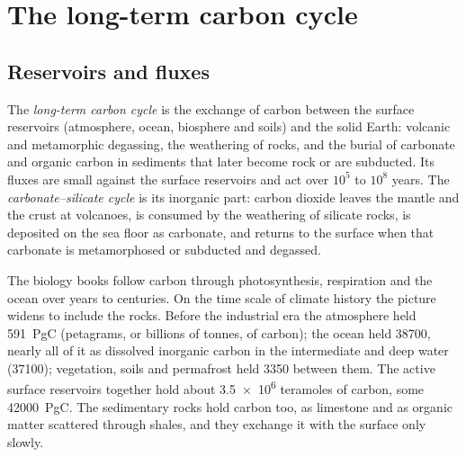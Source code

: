 \section{The long-term carbon cycle}\label{sec:b2:deep-time-climate:cycle}

\subsection*{Reservoirs and fluxes}

\begin{definition}\label{def:b2:deep-time-climate:carbon-cycle}
The \emph{long-term carbon cycle} is the exchange of carbon between
the surface reservoirs (atmosphere, ocean, biosphere and soils) and the solid Earth: volcanic and
metamorphic degassing, the weathering of rocks, and the burial of carbonate and organic carbon in
sediments that later become rock or are subducted. Its fluxes are small against the surface
reservoirs and act over $10^5$ to $10^8$ years. The \emph{carbonate--silicate
cycle} is its inorganic part: carbon dioxide leaves the mantle
and the crust at volcanoes, is consumed by the weathering of silicate rocks, is deposited on the
sea floor as carbonate, and returns to the surface when that carbonate is metamorphosed or
subducted and degassed.
\end{definition}

The biology books follow carbon through photosynthesis, respiration and the ocean over years to
centuries. On the time scale of climate history the picture widens to include the rocks. Before
the industrial era the atmosphere held \qty{591}{PgC} (petagrams, or billions of tonnes, of carbon);
the ocean held \num{38700}, nearly all of it as dissolved inorganic carbon in the intermediate and
deep water (\num{37100}); vegetation, soils and permafrost held \num{3350} between them. The
active surface reservoirs together hold about \num{3.5e6} teramoles of carbon, some
\qty{42000}{PgC}. The sedimentary rocks hold carbon too, as limestone and as organic matter
scattered through shales, and they exchange it with the surface only slowly.

